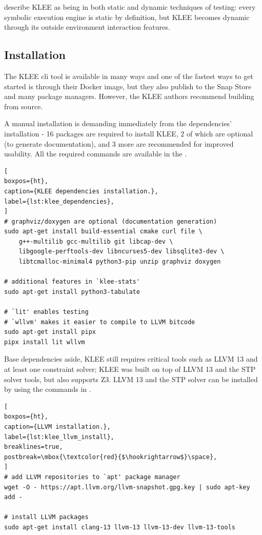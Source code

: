 \citet{Cadar2008} describe KLEE as being in both static and dynamic techniques of testing: every symbolic execution engine is static by definition, but KLEE becomes dynamic through its outside environment interaction features.

\subsection{Installation}\label{section:klee_install}

The KLEE \acrshort{cli} tool is available in many ways and one of the fastest ways to get started is through their Docker image, but they also publish to the Snap Store and many package managers. However, the KLEE authors recommend building from source.

A manual installation is demanding immediately from the dependencies' installation - 16 packages are required to install KLEE, 2 of which are optional (to generate documentation), and 3 more are recommended for improved usability. All the required commands are available in the .

\noindent %
\begin{minipage}{\textwidth}
\begin{lstlisting}[
boxpos={ht},
caption={KLEE dependencies installation.},
label={lst:klee_dependencies},
]
# graphviz/doxygen are optional (documentation generation)
sudo apt-get install build-essential cmake curl file \
    g++-multilib gcc-multilib git libcap-dev \
    libgoogle-perftools-dev libncurses5-dev libsqlite3-dev \
    libtcmalloc-minimal4 python3-pip unzip graphviz doxygen

# additional features in `klee-stats'
sudo apt-get install python3-tabulate

# `lit' enables testing 
# `wllvm' makes it easier to compile to LLVM bitcode
sudo apt-get install pipx
pipx install lit wllvm

\end{lstlisting}
\end{minipage}

Base dependencies aside, KLEE still requires critical tools such as LLVM 13 and at least one constraint solver; KLEE was built on top of LLVM 13 and the STP solver tools, but also supports Z3. LLVM 13 and the STP solver can be installed by using the commands in .

\begin{lstlisting}[
boxpos={ht},
caption={LLVM installation.},
label={lst:klee_llvm_install},
breaklines=true,
postbreak=\mbox{\textcolor{red}{$\hookrightarrow$}\space},
]
# add LLVM repositories to `apt' package manager
wget -O - https://apt.llvm.org/llvm-snapshot.gpg.key | sudo apt-key add -

# install LLVM packages
sudo apt-get install clang-13 llvm-13 llvm-13-dev llvm-13-tools
\end{lstlisting}

